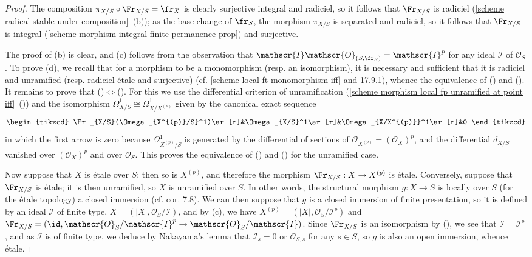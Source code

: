 \begin{proof}
The composition $\pi_{X/S}\circ\Fr_{X/S}=\fr_X$ is clearly surjective integral and radiciel, so it follows that $\Fr_{X/S}$ is radiciel (\cref{scheme radical stable under composition}~(b)); as the base change of $\fr_S$, the morphism $\pi_{X/S}$ is separated and radiciel, so it follows that $\Fr_{X/S}$ is integral (\cref{scheme morphism integral finite permanence prop}) and surjective.\par
The proof of (b) is clear, and (c) follows from the observation that $\mathscr{I}\mathscr{O}_{(S,\fr_S)}=\mathscr{I}^p$ for any ideal $\mathscr{I}$ of $\mathscr{O}_S$. To prove (d), we recall that for a morphism to be a monomorphism (resp. an isomorphism), it is necessary and sufficient that it is radiciel and unramified (resp. radiciel \'etale and surjective) (cf. \cref{scheme local ft monomorphism iff} and \cite{EGA4-4} 17.9.1), whence the equivalence of () and (). It remains to prove that ()$\Leftrightarrow$(). For this we use the differential criterion of unramification (\cref{scheme morphism local fp unramified at point iff}~()) and the isomorphism $\Omega_{X/S}^1\cong\Omega_{X/X^{(p)}}^1$ given by the canonical exact sequence
\[\begin{tikzcd}
\Fr_{X/S}(\Omega_{X^{(p)}/S}^1)\ar[r]&\Omega_{X/S}^1\ar[r]&\Omega_{X/X^{(p)}}^1\ar[r]&0
\end{tikzcd}\]
in which the first arrow is zero because $\Omega_{X^{(p)}/S}^1$ is generated by the differential of sections of $\mathscr{O}_{X^{(p)}}=(\mathscr{O}_X)^p$, and the differential $d_{X/S}$ vanished over $(\mathscr{O}_X)^p$ and over $\mathscr{O}_S$. This proves the equivalence of () and () for the unramified case.\par
Now suppose that $X$ is \'etale over $S$; then so is $X^{(p)}$, and therefore the morphism $\Fr_{X/S}:X\to X^{(p)}$ is \'etale. Conversely, suppose that $\Fr_{X/S}$ is \'etale; it is then unramified, so $X$ is unramified over $S$. In other words, the structural morphism $g:X\to S$ is locally over $S$ (for the \'etale topology) a closed immersion (cf. \cite{SGA1}  cor. 7.8). We can then suppose that $g$ is a closed immersion of finite presentation, so it is defined by an ideal $\mathscr{I}$ of finite type, $X=(|X|,\mathscr{O}_S/\mathscr{I})$, and by (c), we have $X^{(p)}=(|X|,\mathscr{O}_S/\mathscr{I}^p)$ and $\Fr_{X/S}=(\id,\mathscr{O}_S/\mathscr{I}^p\to\mathscr{O}_S/\mathscr{I})$. Since $\Fr_{X/S}$ is an isomorphism by (), we see that $\mathscr{I}=\mathscr{I}^p$, and as $\mathscr{I}$ is of finite type, we deduce by Nakayama's lemma that $\mathscr{I}_s=0$ or $\mathscr{O}_{S,s}$ for any $s\in S$, so $g$ is also an open immersion, whence \'etale.
\end{proof}

